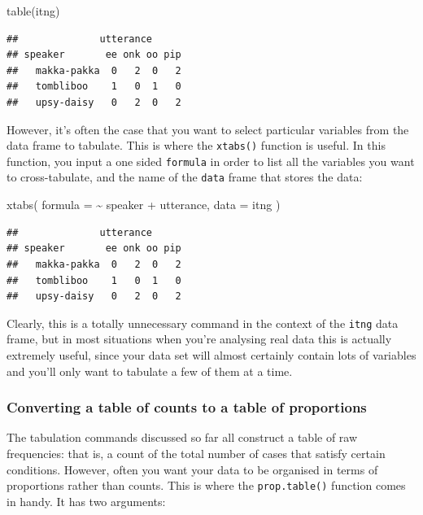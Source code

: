 \documentclass[
]{book}
\newenvironment{Shaded}{\begin{snugshade}}{\end{snugshade}}
\newcommand{\AttributeTok}[1]{\textcolor[rgb]{0.77,0.63,0.00}{#1}}
\newcommand{\FunctionTok}[1]{\textcolor[rgb]{0.00,0.00,0.00}{#1}}
\newcommand{\NormalTok}[1]{#1}
\newcommand{\SpecialCharTok}[1]{\textcolor[rgb]{0.00,0.00,0.00}{#1}}
\begin{document}
\begin{Shaded}
\begin{Highlighting}[]
\FunctionTok{table}\NormalTok{(itng)}
\end{Highlighting}
\end{Shaded}

\begin{verbatim}
##              utterance
## speaker       ee onk oo pip
##   makka-pakka  0   2  0   2
##   tombliboo    1   0  1   0
##   upsy-daisy   0   2  0   2
\end{verbatim}

However, it's often the case that you want to select particular variables from the data frame to tabulate. This is where the \texttt{xtabs()} function is useful. In this function, you input a one sided \texttt{formula} in order to list all the variables you want to cross-tabulate, and the name of the \texttt{data} frame that stores the data:

\begin{Shaded}
\begin{Highlighting}[]
\FunctionTok{xtabs}\NormalTok{( }\AttributeTok{formula =} \SpecialCharTok{\textasciitilde{}}\NormalTok{ speaker }\SpecialCharTok{+}\NormalTok{ utterance, }\AttributeTok{data =}\NormalTok{ itng )}
\end{Highlighting}
\end{Shaded}

\begin{verbatim}
##              utterance
## speaker       ee onk oo pip
##   makka-pakka  0   2  0   2
##   tombliboo    1   0  1   0
##   upsy-daisy   0   2  0   2
\end{verbatim}

Clearly, this is a totally unnecessary command in the context of the \texttt{itng} data frame, but in most situations when you're analysing real data this is actually extremely useful, since your data set will almost certainly contain lots of variables and you'll only want to tabulate a few of them at a time.

\hypertarget{converting-a-table-of-counts-to-a-table-of-proportions}{%
\subsubsection{Converting a table of counts to a table of proportions}\label{converting-a-table-of-counts-to-a-table-of-proportions}}

The tabulation commands discussed so far all construct a table of raw frequencies: that is, a count of the total number of cases that satisfy certain conditions. However, often you want your data to be organised in terms of proportions rather than counts. This is where the \texttt{prop.table()} function comes in handy. It has two arguments:
\end{document}
